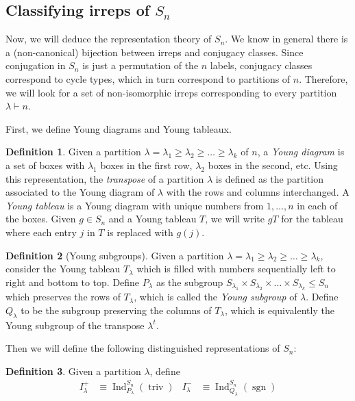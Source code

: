 \documentclass[11pt]{article}
\theoremstyle{definition}
\newtheorem{defn}{Definition}
\newcommand{\Ind}{\operatorname{Ind}}
\begin{document}
\subsection{Classifying irreps of $S_n$}
Now, we will deduce the representation theory of $S_n$. We know in general there is a (non-canonical) bijection between
irreps and conjugacy classes. Since conjugation in $S_n$ is just a permutation
of the $n$ labels, conjugacy classes correspond to cycle types, which in turn
correspond to partitions of $n$. Therefore, we will look for a set of
non-isomorphic irreps corresponding to every partition $\lambda \vdash n$. 

First, we define Young diagrams and Young tableaux.
\begin{defn}
  Given a partition $\lambda = \lambda_1 \geq \lambda_2 \geq \dots \geq
  \lambda_k$ of $n$, a \textit{Young diagram} is a set of boxes with $\lambda_1$ boxes in
  the first row, $\lambda_2$ boxes in the second, etc.
  Using this representation, the \textit{transpose} of a partition $\lambda$ is defined as the
  partition associated to the Young diagram of $\lambda$ with the rows and
  columns interchanged.
  A \textit{Young tableau} is a
  Young diagram with unique numbers from $1, \dots, n$ in each of the boxes. Given $g \in S_n$ and a Young
  tableau $T$, we will write $gT$ for the tableau where each entry $j$ in $T$
  is replaced with $g(j)$.
\end{defn}

\begin{defn}[Young subgroups]
 Given a partition $\lambda = \lambda_1 \geq \lambda_2 \geq \dots \geq
  \lambda_k$, consider the Young tableau $T_\lambda$ which is
 filled with numbers sequentially left to right and bottom to top.
 Define
 $P_\lambda$ as the subgroup $S_{\lambda_1} \times S_{\lambda_2} \times \dots
 \times S_{\lambda_k} \leq S_n$ which preserves the rows of $T_\lambda$, which
 is called the \textit{Young subgroup} of $\lambda$.
 Define $Q_\lambda$ to be the subgroup preserving the columns of $T_\lambda$,
 which is equivalently the Young subgroup of the transpose $\lambda^t$.
\end{defn}

Then we will define the following distinguished representations of $S_n$:
\begin{defn}
  Given a partition $\lambda$, define
  \begin{align}
    I^+_\lambda &\equiv \Ind_{P_\lambda}^{S_n}(\operatorname{triv}) & I^-_\lambda &\equiv \Ind_{Q_{\lambda}}^{S_n}(\operatorname{sgn})
  \end{align}
\end{defn}
\end{document}
